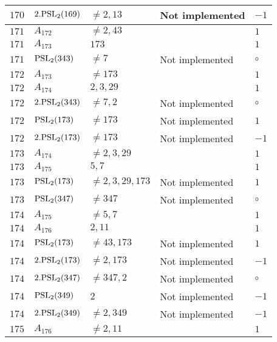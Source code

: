 \documentclass[a4paper, 11pt]{article}
\begin{document}
\begin{longtable}{lllll}
        $ 170 $ & $ 2.{\rm PSL}_{2}(169) $ & $ \neq 2, 13 $ & Not implemented & $ -1  $ \\ \hline
        $ 171 $ & $ A_{172} $ & $ \neq 2, 43 $ & $ ~ $ & $ 1  $ \\ \hline
        $ 171 $ & $ A_{173} $ & $ 173 $ & $ ~ $ & $ 1  $ \\ \hline
        $ 171 $ & $ {\rm PSL}_{2}(343) $ & $ \neq 7 $ & Not implemented & $\circ$ \\ \hline
        $ 172 $ & $ A_{173} $ & $ \neq 173 $ & $ ~ $ & $ 1  $ \\ \hline
        $ 172 $ & $ A_{174} $ & $ 2, 3, 29 $ & $ ~ $ & $ 1  $ \\ \hline
        $ 172 $ & $ 2.{\rm PSL}_{2}(343) $ & $ \neq 7, 2 $ & Not implemented & $\circ$ \\ \hline
        $ 172 $ & $ {\rm PSL}_{2}(173) $ & $ \neq 173 $ & Not implemented & $ 1  $ \\ \hline
        $ 172 $ & $ 2.{\rm PSL}_{2}(173) $ & $ \neq 173 $ & Not implemented & $ -1  $ \\ \hline
        $ 173 $ & $ A_{174} $ & $ \neq 2, 3, 29 $ & $ ~ $ & $ 1  $ \\ \hline
        $ 173 $ & $ A_{175} $ & $ 5, 7 $ & $ ~ $ & $ 1  $ \\ \hline
        $ 173 $ & $ {\rm PSL}_{2}(173) $ & $ \neq 2, 3, 29, 173 $ & Not implemented & $ 1  $ \\ \hline
        $ 173 $ & $ {\rm PSL}_{2}(347) $ & $ \neq 347 $ & Not implemented & $\circ$ \\ \hline
        $ 174 $ & $ A_{175} $ & $ \neq 5, 7 $ & $ ~ $ & $ 1  $ \\ \hline
        $ 174 $ & $ A_{176} $ & $ 2, 11 $ & $ ~ $ & $ 1  $ \\ \hline
        $ 174 $ & $ {\rm PSL}_{2}(173) $ & $ \neq 43, 173 $ & Not implemented & $ 1  $ \\ \hline
        $ 174 $ & $ 2.{\rm PSL}_{2}(173) $ & $ \neq 2, 173 $ & Not implemented & $ -1  $ \\ \hline
        $ 174 $ & $ 2.{\rm PSL}_{2}(347) $ & $ \neq 347, 2 $ & Not implemented & $\circ$ \\ \hline
        $ 174 $ & $ {\rm PSL}_{2}(349) $ & $ 2 $ & Not implemented & $ -1  $ \\ \hline
        $ 174 $ & $ 2.{\rm PSL}_{2}(349) $ & $ \neq 2, 349 $ & Not implemented & $ -1  $ \\ \hline
        $ 175 $ & $ A_{176} $ & $ \neq 2, 11 $ & $ ~ $ & $ 1  $ \\ \hline

\end{longtable}
\end{document}
